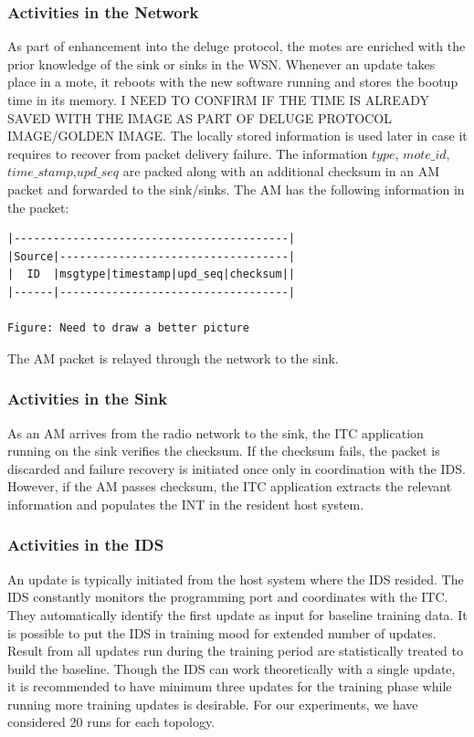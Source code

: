 \documentclass[conference,final]{IEEEtran}
\begin{document}
\subsubsection{Activities in the Network}
\label{ssc:actnet}
As part of enhancement into the deluge protocol, the motes are enriched with the prior knowledge of the sink or sinks in the WSN.
Whenever an update takes place in a mote, it reboots with the new software running and stores the bootup time in its memory.
I NEED TO CONFIRM IF THE TIME IS ALREADY SAVED WITH THE IMAGE AS PART OF DELUGE PROTOCOL IMAGE/GOLDEN IMAGE.
The locally stored information  is used later in case it requires to recover from packet delivery failure.
The information $type$, $mote\_id$,  $time\_stamp$,$upd\_seq$ are packed along with an additional checksum in an AM packet and forwarded to the sink/sinks.
The AM has the following information in the packet:
\begin{verbatim}
|------------------------------------------|
|Source|-----------------------------------|
|  ID  |msgtype|timestamp|upd_seq|checksum||
|------|-----------------------------------|

Figure: Need to draw a better picture
\end{verbatim}
The AM packet is relayed through the network to the sink.

\subsubsection{Activities in the Sink}
\label{ssc:actsink}
As an AM arrives from the radio network to the sink, the ITC application running on the sink verifies the checksum.
If the checksum fails, the packet is discarded and failure recovery is initiated once only in coordination with the IDS.
However, if the AM passes checksum, the ITC application extracts the relevant information and populates the INT in the resident host system. 

\subsubsection{Activities in the IDS}
\label{ssc:actids}
An update is typically initiated from the host system where the IDS resided.
The IDS constantly monitors the programming port and coordinates with the ITC. 
They automatically identify the first update as input for baseline training data.
It is possible to put the IDS in training mood for extended number of updates.
Result from all updates run during the training period are statistically treated to build the baseline.
Though the IDS can work theoretically with a single update, it is recommended to have minimum three updates for the training phase while running more training updates is desirable.
For our experiments, we have considered 20 runs for each topology.
\end{document}
